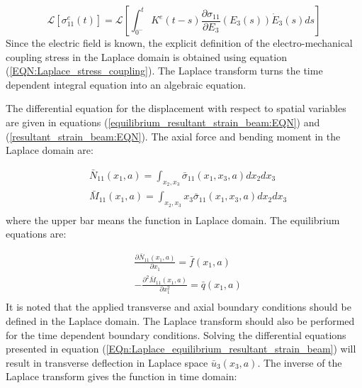 \begin{equation}
\mathcal{L} \left[ \sigma_{11}^e(t) \right]=\mathcal{L} \left[
\int_{0^-}^t
K^e (t-s) \frac{\partial \sigma_{11}}{\partial E_{3}}(E_3(s))  \dot{E}_{3} (s)ds
\right]
\label{EQN:Laplace_stress_coupling}
\end{equation}
Since the electric field is known, the explicit definition of the electro-mechanical coupling stress in the Laplace domain is obtained using equation (\ref{EQN:Laplace_stress_coupling}).
The Laplace transform turns the time dependent integral equation into an algebraic equation.


The differential equation for the displacement with respect to spatial variables are given in equations (\ref{equilibrium_resultant_strain_beam:EQN}) and (\ref{resultant_strain_beam:EQN}).
The axial force and bending moment in the Laplace domain are:

\begin{equation}
\begin{aligned}
&\bar{N}_{11} (x_1,a)=\int_{x_2,x_3} \bar{\sigma}_{11} (x_1,x_3,a) dx_2 dx_3 \\
&\bar{M}_{11} (x_1,a)=\int_{x_2,x_3} x_3 \bar{ \sigma}_{11} (x_1,x_3,a) dx_2 dx_3 \\
\end{aligned}
\label{EQN:laplac_resultant_strain_beam}
\end{equation}
where the upper bar means the function in Laplace domain.
The equilibrium equations are:

\begin{equation}
\begin{aligned}
& \frac{\partial \bar{N}_{11} (x_1,a)}{\partial x_1}=\bar{f}(x_1,a) \\
& -\frac{\partial^2 \bar{M}_{11} (x_1,a)}{ \partial x^2_1}=\bar{q}(x_1,a)\\
\end{aligned}
\label{EQn:Laplace_equilibrium_resultant_strain_beam}
\end{equation}
It is noted that the applied transverse and axial boundary conditions should be defined in the Laplace domain.
The Laplace transform should also be performed for the time dependent boundary conditions.
Solving the differential equations presented in equation (\ref{EQn:Laplace_equilibrium_resultant_strain_beam}) will result in transverse deflection in Laplace space $\bar{u}_3(x_3,a)$.
The inverse of the Laplace transform gives the function in time domain:

